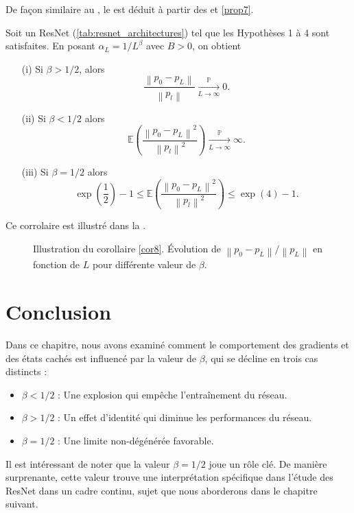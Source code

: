 De façon similaire au , le  est déduit à partir des  et \ref{prop7}.

\begin{cor}\label{cor8}
    Soit un ResNet (\ref{tab:resnet_architectures}) tel que les Hypothèses 1 à 4 sont satisfaites. En posant $ \alpha _L = 1 / L^\beta $ avec $ B > 0 $, on obtient 
    \begin{enumerate}
        \item [(i)] Si $ \beta > 1/2 $, alors 
        \[
            \frac{\left\| p_0 - p_L \right\| }{\left\| p_l \right\|  } \xrightarrow[L \to \infty]{\mathbb{P}} 0
        .\]
        \item [(ii)] Si $ \beta < 1/2 $ alors 
        \[
            \mathbb{E}\left(\frac{\left\| p_0 - p_L \right\| ^2 }{\left\| p_l \right\| ^2 }\right) \xrightarrow[L \to \infty]{\mathbb{P}} \infty
        .\]
        \item [(iii)] Si $ \beta = 1/2 $ alors
        \[
            \exp (\frac{1}{2}) - 1 \leqslant \mathbb{E}\left(\frac{\left\| p_0 - p_L \right\| ^2 }{\left\| p_l \right\| ^2 }\right) \leqslant \exp (4) - 1
        .\]
    \end{enumerate}
    Ce corrolaire est illustré dans la .
\end{cor}

\begin{figure}[H]
    \centering
    \caption{Illustration du corollaire \ref{cor8}. Évolution de $ \left\| p_0 - p_L \right\| / \left\| p_L \right\| $ en fonction de $ L $ pour différente valeur de $ \beta  $.}
    \label{fig:cor8}
\end{figure}

\section{Conclusion}
Dans ce chapitre, nous avons examiné comment le comportement des gradients et des états cachés est influencé par la valeur de $\beta$, qui se décline en trois cas distincts :
\begin{itemize}
    \item $\beta < 1/2$ : Une explosion qui empêche l'entraînement du réseau.
    \item $\beta > 1/2$ : Un effet d'identité qui diminue les performances du réseau.
    \item $\beta = 1/2$ : Une limite non-dégénérée favorable.
\end{itemize}
Il est intéressant de noter que la valeur $\beta = 1/2$ joue un rôle clé. De manière surprenante, cette valeur trouve une interprétation spécifique dans l'étude des ResNet dans un cadre continu, sujet que nous aborderons dans le chapitre suivant.
